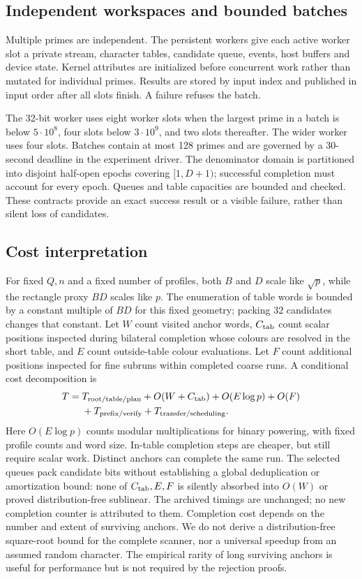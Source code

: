 \documentclass[11pt]{article}
\theoremstyle{definition}\newtheorem{remark}[theorem]{Remark}
\begin{document}
\subsection{Independent workspaces and bounded batches}
Multiple primes are independent. The persistent workers give each active
worker slot a private stream, character tables, candidate queue, events, host
buffers and device state. Kernel attributes are initialized before concurrent
work rather than mutated for individual primes. Results are stored by
input index and published in input order after all slots finish. A failure
refuses the batch.

The 32-bit worker uses eight worker slots when the largest prime in a batch is
below $5\cdot10^8$, four slots below $3\cdot10^9$, and two slots thereafter. The wider
worker uses four slots. Batches contain at most 128 primes and are governed
by a 30-second deadline in the experiment driver. The denominator domain
is partitioned into disjoint half-open epochs covering $[1,D+1)$; successful
completion must account for every epoch. Queues and table capacities are
bounded and checked. These contracts provide an exact success result or a
visible failure, rather than silent loss of candidates.

\subsection{Cost interpretation}
For fixed $Q,n$ and a fixed number of profiles, both $B$ and $D$ scale like
$\sqrt p$, while the rectangle proxy $BD$ scales like $p$.
The enumeration of table words is bounded by a constant multiple of $BD$
for this fixed geometry; packing 32 candidates changes that constant.
Let $W$ count visited anchor words, $C_{\rm tab}$ count scalar positions
inspected during bilateral completion whose colours are resolved in the
short table, and $E$ count outside-table colour evaluations. Let $F$ count
additional positions inspected for fine subruns within completed coarse
runs. A conditional cost decomposition is
\[
\begin{split}
 T={}&T_{\rm root/table/plan}+O(W+C_{\rm tab})+O(E\log p)+O(F)\\
     &+T_{\rm prefix/verify}+T_{\rm transfer/scheduling}.
\end{split}
\]
Here $O(E\log p)$ counts modular multiplications for binary powering, with
fixed profile counts and word size. In-table completion steps are cheaper,
but still require scalar work. Distinct anchors can complete the same run.
The selected queues pack candidate bits without establishing a global
deduplication or amortization bound: none of $C_{\rm tab},E,F$ is silently
absorbed into $O(W)$ or proved distribution-free sublinear. The archived
timings are unchanged; no new completion counter is attributed to them.
Completion cost depends on the number and extent of surviving anchors. We do not derive a distribution-free square-root bound for the
complete scanner, nor a universal speedup from an assumed random character.
The empirical rarity of long surviving anchors is useful for performance
but is not required by the rejection proofs.
\end{document}
